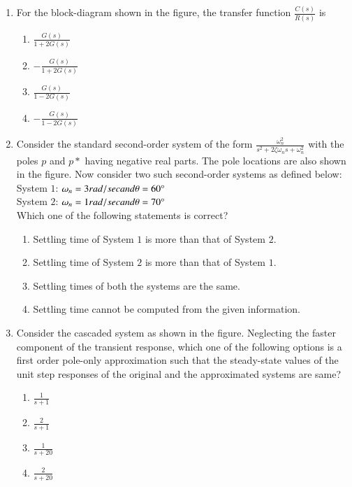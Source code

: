 \documentclass[journal,12pt,onecolumn]{IEEEtran}
\theoremstyle{remark}
\begin{document}
\begin{enumerate}
\item For  the block-diagram shown in the figure, the transfer function $\frac{C(s)}{R(s)}$ is

\begin{enumerate}
    \item $\frac{G(s)}{1+2G(s)}$
    \item $-\frac{G(s)}{1+2G(s)}$
    \item $\frac{G(s)}{1-2G(s)}$
    \item $-\frac{G(s)}{1-2G(s)}$ \\
\end{enumerate}
\item Consider the standard second-order system of the form $\frac{\omega_n^2}{s^2+2\zeta\omega_n s+\omega_n^2}$ with the 
poles $p$ and $p*$ having negative real parts. The pole locations are also shown in the 
figure. Now consider two such second-order systems as defined below: \\
System $1$: $\omega_n=3 rad/sec and \theta=60\degree$\\
System $2$: $\omega_n=1 rad/sec and \theta=70\degree$\\

Which one of the following statements is correct?
\begin{enumerate}
    \item Settling time of System $1$ is more than that of System $2$.
    \item Settling time of System $2$ is more than that of System $1$.
    \item Settling times of both the systems are the same. 
    \item Settling time cannot be computed from the given information. \\
\end{enumerate}
\item Consider the cascaded system as shown in the figure. Neglecting the faster 
component of the transient response, which one of the following options is a first
order pole-only approximation such that the steady-state values of the unit step 
responses of the original and the approximated systems are same?  

\begin{enumerate}
    \item $\frac{1}{s+1}$
    \item $\frac{2}{s+1}$
    \item $\frac{1}{s+20}$
    \item $\frac{2}{s+20}$\\
\end{enumerate}

\end{enumerate}
\end{document}
